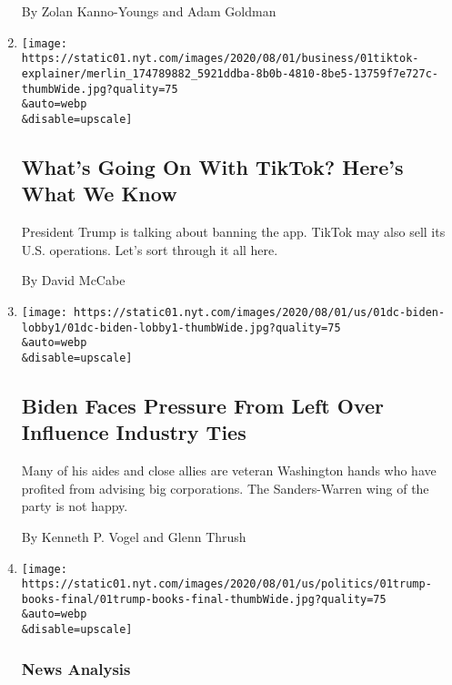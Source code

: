 \begin{enumerate}
  By Zolan Kanno-Youngs and Adam Goldman
\item
  \href{/2020/08/01/technology/tiktok-trump-microsoft-bytedance-china-ban.html}{}

  \texttt{[image: https://static01.nyt.com/images/2020/08/01/business/01tiktok-explainer/merlin\_174789882\_5921ddba-8b0b-4810-8be5-13759f7e727c-thumbWide.jpg?quality=75\\\&auto=webp\\\&disable=upscale]}

  \hypertarget{whats-going-on-with-tiktok-heres-what-we-know}{%
  \subsection{What's Going On With TikTok? Here's What We
  Know}\label{whats-going-on-with-tiktok-heres-what-we-know}}

  President Trump is talking about banning the app. TikTok may also sell
  its U.S. operations. Let's sort through it all here.

  By David McCabe
\item
  \href{/2020/08/01/us/politics/biden-lobbyist-ties.html}{}

  \texttt{[image: https://static01.nyt.com/images/2020/08/01/us/01dc-biden-lobby1/01dc-biden-lobby1-thumbWide.jpg?quality=75\\\&auto=webp\\\&disable=upscale]}

  \hypertarget{biden-faces-pressure-from-left-over-influence-industry-ties}{%
  \subsection{Biden Faces Pressure From Left Over Influence Industry
  Ties}\label{biden-faces-pressure-from-left-over-influence-industry-ties}}

  Many of his aides and close allies are veteran Washington hands who
  have profited from advising big corporations. The Sanders-Warren wing
  of the party is not happy.

  By Kenneth P. Vogel and Glenn Thrush
\item
  \href{/2020/08/01/us/politics/trump-books.html}{}

  \texttt{[image: https://static01.nyt.com/images/2020/08/01/us/politics/01trump-books-final/01trump-books-final-thumbWide.jpg?quality=75\\\&auto=webp\\\&disable=upscale]}

  \hypertarget{news-analysis-1}{%
  \subsubsection{News Analysis}\label{news-analysis-1}}


\end{enumerate}

